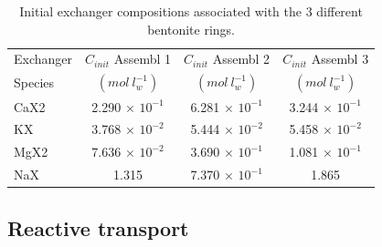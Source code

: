 \begin{table}
\caption{Initial exchanger compositions associated with the 3 different bentonite rings.}
\begin{center}
\begin{tabular}{l c c c}
\hline
 Exchanger   & $C_{init}$ Assembl 1     & $C_{init}$  Assembl 2     & $C_{init}$  Assembl 3 \\
 Species     & $(mol\ l^{-1}_w)$        & $(mol\ l^{-1}_w)$         & $(mol\ l^{-1}_w)$   \\ \hline
 CaX2        & 2.290 $\times$ $10^{-1}$ & 6.281 $\times$ $10^{-1}$  & 3.244 $\times$ $10^{-1}$\\
 KX          & 3.768 $\times$ $10^{-2}$ & 5.444 $\times$ $10^{-2}$  & 5.458 $\times$ $10^{-2}$\\
 MgX2        & 7.636 $\times$ $10^{-2}$ & 3.690 $\times$ $10^{-1}$  & 1.081 $\times$ $10^{-1}$\\
 NaX         & 1.315  & 7.370 $\times$ $10^{-1}$  & 1.865 \\
\end{tabular}
\label{ex_wallis_ex_conc}
\end{center}
\end{table}


\subsection[Reactive transport]{Reactive transport}
	
